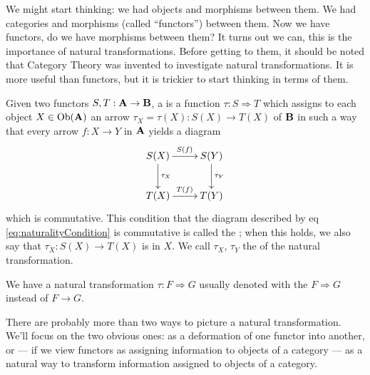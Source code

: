 
We might start thinking: we had objects and morphisms between
them. We had categories and morphisms (called ``functors'')
between them. Now we have functors, do we have morphisms between
them? It turns out we can, this is the importance of natural
transformations. Before getting to them, it should be noted that
Category Theory was invented to investigate natural
transformations. It is more useful than functors, but it is
trickier to start thinking in terms of them.

\begin{defn}%
Given two functors $S,T:\mathbf{A}\to\mathbf{B}$, a  
is a function $\tau:S\Rightarrow T$ which assigns to each object
$X\in\operatorname{Ob}(\mathbf{A})$ an arrow $\tau_{X}=\tau(X):S(X)\to T(X)$ of
$\mathbf{B}$ in such a way that every arrow $f:X\to Y$ in $\mathbf{A}$
yields a diagram
\begin{equation}\label{eq:naturalityCondition}
\vcenter{\xymatrix{
S(X)\ar[d]^{\tau_{X}} \ar[r]^{S(f)} & S(Y)\ar[d]^{\tau_{Y}}\\
T(X)\ar[r]^{T(f)} & T(Y)
}}
\end{equation}
which is commutative. This condition that the diagram described
by eq \eqref{eq:naturalityCondition} is commutative is called the
; when this holds, we also say that
$\tau_{X}:S(X)\to T(X)$ is  in $X$. We call
$\tau_{X}$, $\tau_{Y}$ the  of  the natural
transformation. 
\end{defn}

\begin{rmk}[Notation]
We have a natural transformation $\tau:F\Rightarrow G$ usually
denoted with the $F\Rightarrow G$ instead of $F\to G$.
\end{rmk}

There are probably more than two ways to picture a natural
transformation. We'll focus on the two obvious ones: as a
deformation of one functor into another, or --- if we view functors
as assigning information to objects of a category --- as a
natural way to transform information assigned to objects of a
category.


